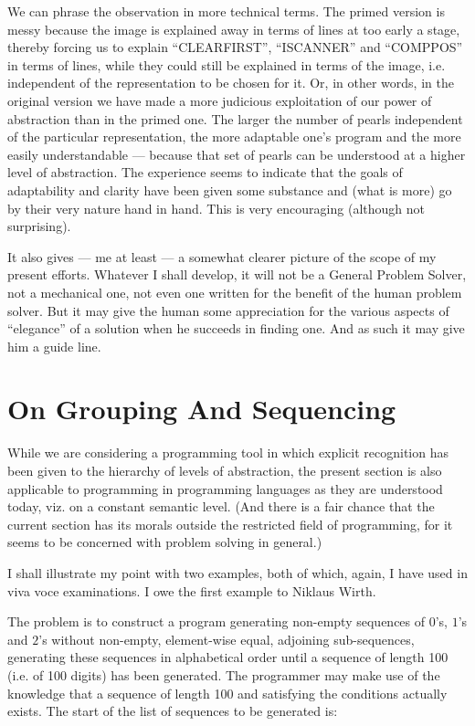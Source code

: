 We can phrase the observation in more technical terms. The primed version is messy because the image is explained away in terms of lines at too early a stage, thereby forcing us to explain ``CLEARFIRST'', ``ISCANNER'' and ``COMPPOS'' in terms of lines, while they could still be explained in terms of the image, i.e. independent of the representation to be chosen for it. Or, in other words, in the original version we have made a more judicious exploitation of our power of abstraction than in the primed one. The larger the number of pearls independent of the particular representation, the more adaptable one's program and the more easily understandable --- because that set of pearls can be understood at a higher level of abstraction. The experience seems to indicate that the goals of adaptability and clarity have been given some substance and (what is more) go by their very nature hand in hand. This is very encouraging (although not surprising).

It also gives --- me at least --- a somewhat clearer picture of the scope of my present efforts. Whatever I shall develop, it will not be a General Problem Solver, not a mechanical one, not even one written for the benefit of the human problem solver. But it may give the human some appreciation for the various aspects of ``elegance'' of a solution when he succeeds in finding one. And as such it may give him a guide line.

\section[On grouping and sequencing]{On Grouping And Sequencing}
\label{sec:grouping-and-sequencing}

While we are considering a programming tool in which explicit recognition has been given to the hierarchy of levels of abstraction, the present section is also applicable to programming in programming languages as they are understood today, viz. on a constant semantic level. (And there is a fair chance that the current section has its morals outside the restricted field of programming, for it seems to be concerned with problem solving in general.)

I shall illustrate my point with two examples, both of which, again, I have used in viva voce examinations. I owe the first example to Niklaus Wirth.

The problem is to construct a program generating non-empty sequences of $0$'s, $1$'s and $2$'s without non-empty, element-wise equal, adjoining sub-sequences, generating these sequences in alphabetical order until a sequence of length 100 (i.e. of 100 digits) has been generated. The programmer may make use of the knowledge that a sequence of length 100 and satisfying the conditions actually exists. The start of the list of sequences to be generated is:

